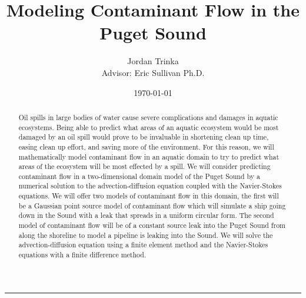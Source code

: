 \documentclass[a4paper]{article}
\title{Modeling Contaminant Flow in the Puget Sound\\}
\author{Jordan Trinka\\
Advisor: Eric Sullivan Ph.D.}
\date{\today}
\theoremstyle{remark}
\theoremstyle{remark}
\begin{document}
\maketitle
\begin{abstract}
Oil spills in large bodies of water cause severe complications and damages in aquatic ecosystems. Being able to predict what areas of an aquatic ecosystem would be most damaged by an oil spill would prove to be invaluable in shortening clean up time, easing clean up effort, and saving more of the environment. For this reason, we will mathematically model contaminant flow in an aquatic domain to try to predict what areas of the ecosystem will be most effected by a spill. We will consider predicting contaminant flow in a two-dimensional domain model of the Puget Sound by a numerical solution to the advection-diffusion equation coupled with the Navier-Stokes equations. We will offer two models of contaminant flow in this domain, the first will be a Gaussian point source model of contaminant flow which will simulate a ship going down in the Sound with a leak that spreads in a uniform circular form. The second model of contaminant flow will be of a constant source leak into the Puget Sound from along the shoreline to model a pipeline is leaking into the Sound. We will solve the advection-diffusion equation using a finite element method and the Navier-Stokes equations with a finite difference method.
\end{abstract}

\newpage
{}
\tableofcontents %
\vspace{0.1in}\hrule
\newpage
{}
\listoffigures
\listoftables
\newpage
\lhead{}
\end{document}
